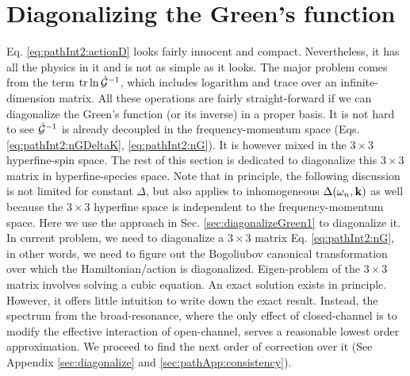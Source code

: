 \section{Diagonalizing the Green's function\label{sec:diagonalGreen}}
Eq. \eqref{eq:pathInt2:actionD} looks fairly innocent and compact.  Nevertheless, it has all the physics in it and is not as simple as it looks.  The major problem comes from the term $\text{tr}\ln\hat{\mathcal{G}}^{-1}$, which includes  logarithm and trace over an infinite-dimension matrix.   All these operations are fairly straight-forward if we can diagonalize the  Green's function (or its inverse) in a proper basis.      It is not hard to see $\hat{\mathcal{G}}^{-1}$ is already decoupled in the frequency-momentum space (Eqs.  \ref{eq:pathInt2:nGDeltaK}, \ref{eq:pathInt2:nG}).  It is however mixed in the $3\times3$ hyperfine-spin space.  The rest of this section is dedicated to diagonalize this $3\times3$ matrix in hyperfine-species space.  Note that in principle, the following discussion is not limited for constant $\Delta$, but also applies to inhomogeneous $\Delta(\omega_{n},\mathbf{k})$ as well because the $3\times3$ hyperfine space is independent to the frequency-momentum space.   Here we use the approach in Sec. \ref{sec:diagonalizeGreen1} to diagonalize it.   
In current problem, we need to diagonalize a $3\times3$ matrix Eq. \ref{eq:pathInt2:nG}, in other words, we need to figure out the Bogoliubov canonical transformation over which the Hamiltonian/action is diagonalized.   Eigen-problem of the $3\times3$ matrix involves solving a cubic equation. An exact solution exists in principle.  However,  it offers little intuition to write down the exact result. Instead,  the spectrum from the broad-resonance, where the only effect of closed-channel is to modify the effective interaction of open-channel, serves a reasonable lowest order approximation. We proceed to find the next order of correction over it (See Appendix \ref{sec:diagonalize} and \ref{sec:pathApp:consistency}). 


